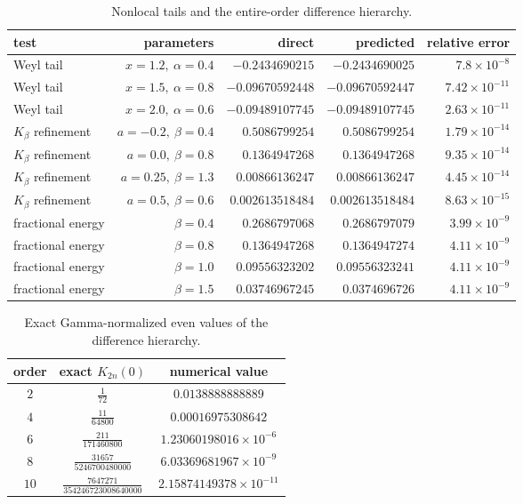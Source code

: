 \begin{table}[htbp]
\centering\small
\caption{Nonlocal tails and the entire-order difference hierarchy.}
\label{tab:nonlocal-checks}
\begin{tabular}{@{}lrrrr@{}}
\toprule
test & parameters & direct & predicted & relative error\\
\midrule
Weyl tail & $x=1.2,\ \alpha=0.4$ & $-0.2434690215$ & $-0.2434690025$ & $7.8\mathbin{\times}10^{-8}$\\
Weyl tail & $x=1.5,\ \alpha=0.8$ & $-0.09670592448$ & $-0.09670592447$ & $7.42\mathbin{\times}10^{-11}$\\
Weyl tail & $x=2.0,\ \alpha=0.6$ & $-0.09489107745$ & $-0.09489107745$ & $2.63\mathbin{\times}10^{-11}$\\
$K_\beta$ refinement & $a=-0.2,\ \beta=0.4$ & $0.5086799254$ & $0.5086799254$ & $1.79\mathbin{\times}10^{-14}$\\
$K_\beta$ refinement & $a=0.0,\ \beta=0.8$ & $0.1364947268$ & $0.1364947268$ & $9.35\mathbin{\times}10^{-14}$\\
$K_\beta$ refinement & $a=0.25,\ \beta=1.3$ & $0.00866136247$ & $0.00866136247$ & $4.45\mathbin{\times}10^{-14}$\\
$K_\beta$ refinement & $a=0.5,\ \beta=0.6$ & $0.002613518484$ & $0.002613518484$ & $8.63\mathbin{\times}10^{-15}$\\
fractional energy & $\beta=0.4$ & $0.2686797068$ & $0.2686797079$ & $3.99\mathbin{\times}10^{-9}$\\
fractional energy & $\beta=0.8$ & $0.1364947268$ & $0.1364947274$ & $4.11\mathbin{\times}10^{-9}$\\
fractional energy & $\beta=1.0$ & $0.09556323202$ & $0.09556323241$ & $4.11\mathbin{\times}10^{-9}$\\
fractional energy & $\beta=1.5$ & $0.03746967245$ & $0.0374696726$ & $4.11\mathbin{\times}10^{-9}$\\
\bottomrule
\end{tabular}
\end{table}

\begin{table}[htbp]
\centering\small
\caption{Exact Gamma-normalized even values of the difference hierarchy.}
\label{tab:exact-even-K}
\begingroup
\renewcommand{\arraystretch}{1.70}
\begin{tabular}{@{}ccc@{}}
\toprule
order & exact $K_{2n}(0)$ & numerical value\\
\midrule
$2$ & $\displaystyle \frac{1}{72}$ & $0.0138888888889$\\
$4$ & $\displaystyle \frac{11}{64800}$ & $0.00016975308642$\\
$6$ & $\displaystyle \frac{211}{171460800}$ & $1.23060198016\mathbin{\times}10^{-6}$\\
$8$ & $\displaystyle \frac{31657}{5246700480000}$ & $6.03369681967\mathbin{\times}10^{-9}$\\
$10$ & $\displaystyle \frac{7647271}{354246723008640000}$ & $2.15874149378\mathbin{\times}10^{-11}$\\
\bottomrule
\end{tabular}
\endgroup
\end{table}

